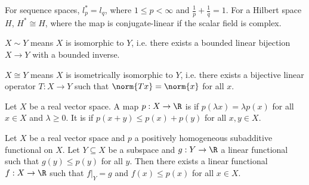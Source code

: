 \documentclass[a4paper]{article}
\begin{document}
\begin{eg}
  For sequence spaces, $l_p^*=l_q$, where $1\leq p<\infty$ and $\frac{1}{p}+\frac{1}{q}=1$. For a Hilbert space $H$, $H^*\cong H$, where the map is conjugate-linear if the scalar field is complex.
\end{eg}

\begin{notation}
  $X\sim Y$ means $X$ is isomorphic to $Y$, i.e. there exists a bounded linear bijection $X\to Y$ with a bounded inverse.

  $X\cong Y$ means $X$ is isometrically isomorphic to $Y$, i.e. there exists a bijective linear operator $T:X\to Y$ such that $\norm{Tx}=\norm{x}$ for all $x$.
\end{notation}

Let $X$ be a real vector space. A map $p:X\to\R$ is  if $p(\lambda x)=\lambda p(x)$ for all $x\in X$ and $\lambda\geq 0$. It is  if $p(x+y)\leq p(x)+p(y)$ for all $x,y\in X$.

\begin{nthm}\label{thm:HahnBanach1}
  Let $X$ be a real vector space and $p$ a positively homogeneous subadditive functional on $X$. Let $Y\subseteq X$ be a subspace and $g:Y\to\R$ a linear functional such that $g(y)\leq p(y)$ for all $y$. Then there exists a linear functional $f:X\to\R$ such that $f|_Y=g$ and $f(x)\leq p(x)$ for all $x\in X$.
\end{nthm}
\end{document}
